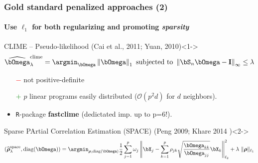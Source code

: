 \begin{frame}
  \frametitle{Gold standard penalized approaches (2)}
  \framesubtitle{Use $\ell_1$ for both regularizing and promoting \textit{sparsity}}

  \begin{overlayarea}{\textwidth}{\textheight}
        
    \begin{block}{CLIME -- Pseudo-likelihood  (Cai et al., 2011;
        Yuan, 2010)}<1->
      \vspace*{-1.5em}
      \begin{equation*}
        \widehat{\invcov}^{\text{clime}}_\lambda  = \argmin_{\invcov}
        \left\|   \invcov \right\|_1 \text{ subjected to }
        \left\|   \empcov \invcov - \mathbf{I} \right\|_\infty\leq \lambda
      \end{equation*}
      \vspace*{-1.5em}
    \end{block}
    
    \begin{itemize}
    \item[\textcolor{red}{$-$}] not positive-definite
    \item[\textcolor{green}{$+$}]  $p$ linear  programs easily
      distributed ($\mathcal{O}(p^2d)$ for $d$ neighbors).
    \item \texttt{R}-package \textbf{fastclime} (dedictated imp. up to p=6!).
    \end{itemize}

      \vspace*{-.5em}
    
    \begin{block}{Sparse PArtial  Correlation Estimation (SPACE)
        (Peng 2009; Khare 2014 )}<2-> 
      \vspace*{-2em}
      \begin{equation*}
        \left(\widehat{\boldsymbol\rho}_\lambda^{\text{space}}, \mathrm{diag}({\boldsymbol\invcov})\right) =
        \argmin_{\boldsymbol\rho,\mathrm{diag}({\boldsymbol\invcov})} \frac{1}{2}
        \sum_{j=1}^p \omega_j \left\|
          \bX_j - \sum_{k=1}^p \rho_{jk} \sqrt{\frac{{\invcov}_{kk}}{{\invcov}_{jj}}}
          \bX_k \right\|_{\ell_2}^2 + \lambda\ \| \boldsymbol\rho \|_{\ell_1}
      \end{equation*}
      \vspace*{-1.5em}
    \end{block}
    
      
\end{overlayarea}      

\end{frame}

